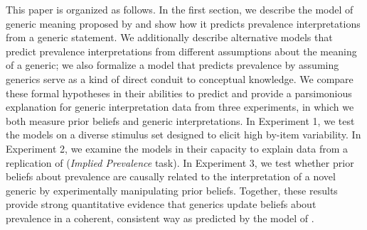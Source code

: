 \documentclass[floatsintext,doc]{apa6}
\begin{document}
%

This paper is organized as follows.
In the first section, we describe the model of generic meaning proposed by  and show how it predicts prevalence interpretations from a generic statement.
We additionally describe alternative models that predict prevalence interpretations from different assumptions about the meaning of a generic; we also formalize a model that predicts prevalence by assuming generics serve as a kind of direct conduit to conceptual knowledge.
We compare these formal hypotheses in their abilities to predict and provide a parsimonious explanation for generic interpretation data from three experiments, in which we both measure prior beliefs and generic interpretations.
In Experiment 1, we test the models on a diverse stimulus set designed to elicit high by-item variability.
In Experiment 2, we examine the models in their capacity to explain data from a replication of  (\emph{Implied Prevalence} task).
In Experiment 3, we test whether prior beliefs about prevalence are causally related to the interpretation of a novel generic by experimentally manipulating prior beliefs.
Together, these results provide strong quantitative evidence that generics update beliefs about prevalence in a coherent, consistent way as predicted by the model of .
\end{document}
